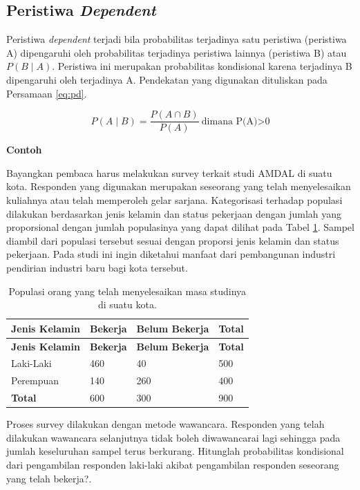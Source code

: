 \documentclass[]{book}
\begin{document}
\subsection{\texorpdfstring{Peristiwa
\emph{Dependent}}{Peristiwa Dependent}}\label{peristiwa-dependent}

Peristiwa \emph{dependent} terjadi bila probabilitas terjadinya satu
peristiwa (peristiwa A) dipengaruhi oleh probabilitas terjadinya
peristiwa lainnya (peristiwa B) atau \(P\left(B\mid A\right)\).
Peristiwa ini merupakan probabilitas kondisional karena terjadinya B
dipengaruhi oleh terjadinya A. Pendekatan yang digunakan dituliskan pada
Persamaan \eqref{eq:pd}.

\begin{equation}
   P\left(A\mid B\right)=\frac{P\left(A\cap B\right)}{P\left(A\right)}\ \text{dimana P(A)>0}
  \label{eq:pd}
\end{equation}

\textbf{Contoh}

Bayangkan pembaca harus melakukan survey terkait studi AMDAL di suatu
kota. Responden yang digunakan merupakan seseorang yang telah
menyelesaikan kuliahnya atau telah memperoleh gelar sarjana.
Kategorisasi terhadap populasi dilakukan berdasarkan jenis kelamin dan
status pekerjaan dengan jumlah yang proporsional dengan jumlah
populasinya yang dapat dilihat pada Tabel \ref{tab:tabpd}. Sampel
diambil dari populasi tersebut sesuai dengan proporsi jenis kelamin dan
status pekerjaan. Pada studi ini ingin diketahui manfaat dari
pembangunan industri pendirian industri baru bagi kota tersebut.

\begin{longtable}[]{@{}llll@{}}
\caption{\label{tab:tabpd} Populasi orang yang telah menyelesaikan masa
studinya di suatu kota.}\tabularnewline
\toprule
\textbf{Jenis Kelamin} & \textbf{Bekerja} & \textbf{Belum Bekerja} &
\textbf{Total}\tabularnewline
\midrule
\endfirsthead
\toprule
\textbf{Jenis Kelamin} & \textbf{Bekerja} & \textbf{Belum Bekerja} &
\textbf{Total}\tabularnewline
\midrule
\endhead
Laki-Laki & 460 & 40 & 500\tabularnewline
Perempuan & 140 & 260 & 400\tabularnewline
\textbf{Total} & 600 & 300 & 900\tabularnewline
\bottomrule
\end{longtable}

Proses survey dilakukan dengan metode wawancara. Responden yang telah
dilakukan wawancara selanjutnya tidak boleh diwawancarai lagi sehingga
pada jumlah keseluruhan sampel terus berkurang. Hitunglah probabilitas
kondisional dari pengambilan responden laki-laki akibat pengambilan
responden seseorang yang telah bekerja?.
\end{document}
